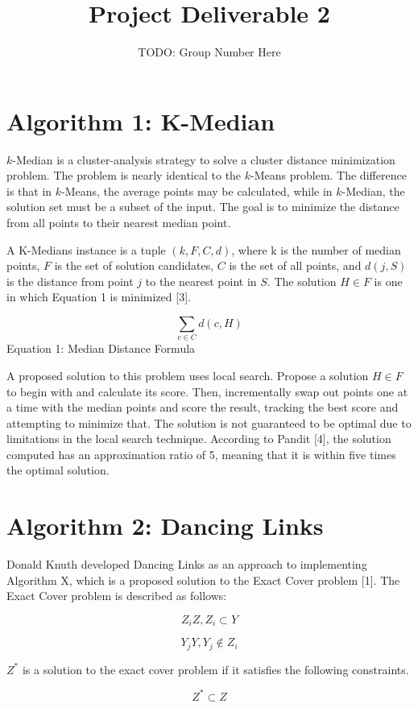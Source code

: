 \documentclass[11pt]{article}
\title{Project Deliverable 2}
\author{TODO: Group Number Here}
\begin{document}
\maketitle

\section*{Algorithm 1: K-Median}

$k$-Median is a cluster-analysis strategy to solve a cluster distance minimization problem. The problem is nearly identical to the $k$-Means problem. The difference is that in $k$-Means, the average points may be calculated, while in $k$-Median, the solution set must be a subset of the input. The goal is to minimize the distance from all points to their nearest median point.

A K-Medians instance is a tuple $(k,F,C,d)$, where k is the number of median points, $F$ is the set of solution candidates, $C$ is the set of all points, and $d(j,S)$ is the distance from point $j$ to the nearest point in $S$. The solution $H \in F$ is one in which Equation 1 is minimized [3].

$$\sum_{c \in C} d(c,H)$$
Equation 1: Median Distance Formula

A proposed solution to this problem uses local search. Propose a solution $H \in F$ to begin with and calculate its score. Then, incrementally swap out points one at a time with the median points and score the result, tracking the best score and attempting to minimize that. The solution is not guaranteed to be optimal due to limitations in the local search technique. According to Pandit [4], the solution computed has an approximation ratio of 5, meaning that it is within five times the optimal solution.

\section*{Algorithm 2: Dancing Links}

Donald Knuth developed Dancing Links as an approach to implementing Algorithm X, which is a proposed solution to the Exact Cover problem [1]. The Exact Cover problem is described as follows:

$$Z_iZ, Z_i \subset Y$$

$$Y_jY, Y_j \notin Z_i$$

$Z^{\ast}$ is a solution to the exact cover problem if it satisfies the following constraints.

$$Z^{\ast} \subset Z$$
\end{document}
